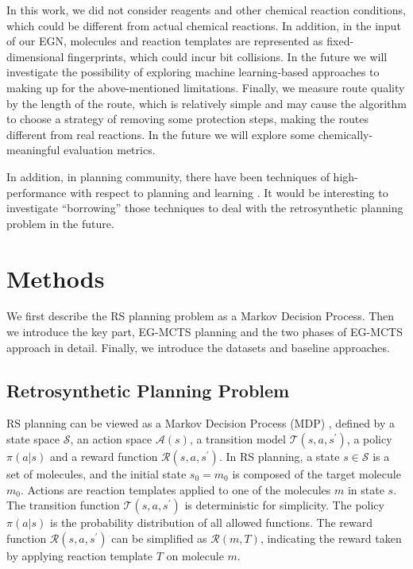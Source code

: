 \documentclass[sn-mathphys,Numbered]{sn-jnl}
\begin{document}
In this work, we did not consider reagents and other chemical reaction conditions, which could be different from actual chemical reactions. 
In addition, in the input of our EGN, molecules and reaction templates are represented as fixed-dimensional fingerprints, which could incur bit collisions. In the future we will investigate the possibility of exploring machine learning-based approaches to making up for the above-mentioned limitations. Finally, we measure route quality by the length of the route, which is relatively simple and may cause the algorithm to choose a strategy of removing some protection steps, making the routes different from real reactions. In the future we will explore some chemically-meaningful evaluation metrics.

In addition, in planning community, there have been techniques of high-performance with respect to planning and learning \citet{DBLP:journals/ai/ZhuoK17,DBLP:journals/ai/Zhuo014,DBLP:journals/ai/ZhuoM014,DBLP:journals/ai/ZhuoYHL10,DBLP:conf/aaai/ShenZXZP20}. It would be interesting to investigate ``borrowing'' those techniques to deal with the retrosynthetic planning problem in the future.


\section{Methods}
We first describe the RS planning problem as a Markov Decision Process. Then we introduce the key part, EG-MCTS planning and the two phases of EG-MCTS approach in detail. Finally, we introduce the datasets and baseline approaches.

\subsection{Retrosynthetic Planning Problem}
RS planning can be viewed as a Markov Decision Process (MDP) \cite{MDP}, defined by a state space $\mathcal{S}$, an action space $\mathcal{A}(s)$, a transition model $\mathcal{T}(s,a,s^{\prime})$, a policy $\pi(a|s)$ and a reward function $\mathcal{R}(s,a,s^{\prime})$. In RS planning, a state $s \in \mathcal{S}$ is a set of molecules, and the initial state $s_0={m_0}$ is composed of the target molecule $m_0$. Actions are reaction templates applied to one of the molecules $m$ in state $s$. 
The transition function $\mathcal{T}(s,a,s^{\prime})$ is deterministic for simplicity. The policy $\pi(a|s)$ is the probability distribution of all allowed functions. The reward function $\mathcal{R}(s,a,s^{\prime})$ can be simplified as $\mathcal{R}(m,T)$, indicating the reward taken by applying reaction template $T$ on molecule $m$.
\end{document}
